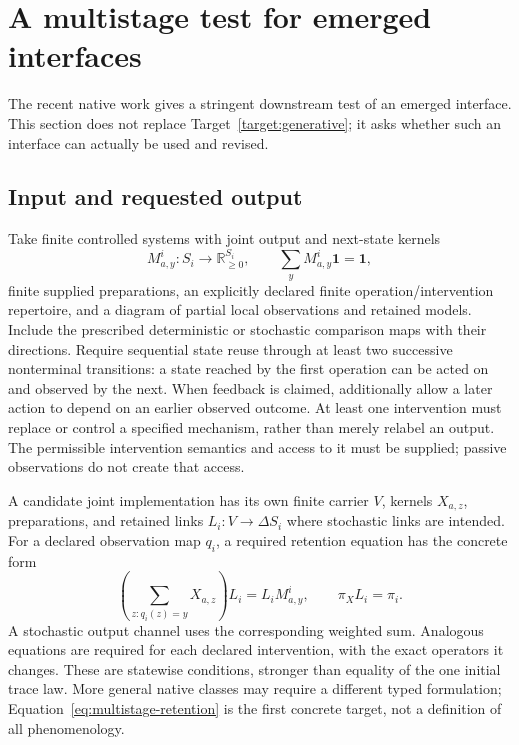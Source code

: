 \documentclass[11pt]{article}
\theoremstyle{remark}
\newcommand{\RR}{\mathbb R}
\newcommand{\one}{\mathbf 1}
\begin{document}
\section{A multistage test for emerged interfaces}
\label{sec:multistage}

The recent native work gives a stringent downstream test of an emerged interface. This section does not replace Target~\ref{target:generative}; it asks whether such an interface can actually be used and revised.

\subsection{Input and requested output}

Take finite controlled systems with joint output and next-state kernels
\[
 M^i_{a,y}:S_i\longrightarrow\RR_{\geq0}^{S_i},
 \qquad \sum_y M^i_{a,y}\one=\one,
\]
finite supplied preparations, an explicitly declared finite operation/intervention repertoire, and a diagram of partial local observations and retained models. Include the prescribed deterministic or stochastic comparison maps with their directions. Require sequential state reuse through at least two successive nonterminal transitions: a state reached by the first operation can be acted on and observed by the next. When feedback is claimed, additionally allow a later action to depend on an earlier observed outcome. At least one intervention must replace or control a specified mechanism, rather than merely relabel an output. The permissible intervention semantics and access to it must be supplied; passive observations do not create that access.

A candidate joint implementation has its own finite carrier $V$, kernels $X_{a,z}$, preparations, and retained links $L_i:V\to\Delta S_i$ where stochastic links are intended. For a declared observation map $q_i$, a required retention equation has the concrete form
\begin{equation}
 \left(\sum_{z:q_i(z)=y}X_{a,z}\right)L_i
 =L_iM^i_{a,y},\qquad \pi_XL_i=\pi_i.
 \label{eq:multistage-retention}
\end{equation}
A stochastic output channel uses the corresponding weighted sum. Analogous equations are required for each declared intervention, with the exact operators it changes. These are statewise conditions, stronger than equality of the one initial trace law. More general native classes may require a different typed formulation; Equation~\eqref{eq:multistage-retention} is the first concrete target, not a definition of all phenomenology.
\end{document}
